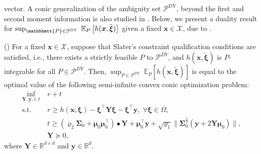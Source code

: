 \documentclass[final,onefignum,onetabnum]{class}
\newcommand{\ee}[2]{\mathbb{E}_{#1} \left[ #2 \right]}
\newcommand{\bs}[1]{\boldsymbol{#1}} %
\newcommand{\Bs}[1]{\mathbb{#1}} %
\newcommand{\Ts}[1]{\mathbbmtt{#1}} %
\newcommand{\Cs}[1]{\mathcal{#1}} %
\newcommand{\txi}{\tilde{\bs{\xi}}}
\newcommand{\st}{\text{s.t.}}
\begin{document}
vector. 
A conic generalization of the ambiguity set $\Cs{P}^{\text{DY}}$, beyond the first and second moment information is also studied in  \citet{delage2009DY}.  
Below, we present a duality result for $\sup_{\Ts{P} \in \Cs{P}^{\text{DY}}} \ \ee{P}{h(\bs{x},\txi)}$ given a fixed $\bs{x} \in \Cs{X}$, due to \citet{delage2010}. %
\begin{theorem}{(\citet[Lemma~1]{delage2010})}
    \label{thm: rev.dual_DelageYe}
    For a fixed $\bs{x} \in \Cs{X}$, suppose that Slater's constraint qualification conditions are satisfied, i.e., there exists a strictly feasible $P$ to  $\Cs{P}^{DY}$, and $h(\bs{x}, \txi)$ is $P$-integrable for all  $P \in \Cs{P}^{DY}$. Then, \linebreak $\sup_{P \in \Cs{P}^{\text{DY}}} \ \ee{P}{h(\bs{x},\txi)}$ is equal to the optimal value of the following semi-infinite convex conic optimization  problem:
    \begin{align*}
        \inf_{\bs{Y},\bs{y},r,t} \ & r+ t \\
        \st \quad & r \ge h(\bs{x},\bs{\xi})-\bs{\xi}^{\top}\bs{Y}\bs{\xi} - \bs{\xi}^{\top} \bs{y}, \; \forall \bs{\xi} \in \Omega,\\
        & t \ge (\varrho_{2} \bs{\Sigma}_{0} + \bs{\mu}_{0} \bs{\mu}_{0}^{\top})\bullet \bs{Y} + \bs{\mu}_{0}^{\top} \bs{y} + \sqrt{\varrho_{1}} \| \bs{\Sigma}_{0} ^{\frac{1}{2}}(\bs{y}+ 2 \bs{Y}\bs{\mu}_{0})\|,\\
        & \bs{Y} \succcurlyeq 0,
    \end{align*}
    where $\bs{Y} \in \Bs{R}^{d \times d}$ and $\bs{y} \in \Bs{R}^{d}$. 
\end{theorem}
\end{document}
